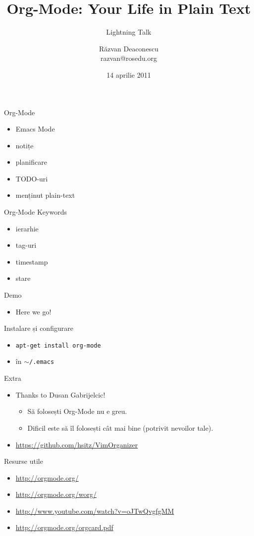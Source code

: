 \documentclass{simple}
\title[Org-Mode]{Org-Mode: Your Life in Plain Text}
\subtitle{Lightning Talk}
\institute{Întâlnirile RLUG -- Aprilie 2011}
\author[Răzvan Deaconescu]{Răzvan Deaconescu\\
	razvan@rosedu.org}
\date{14 aprilie 2011}
\begin{document}
\frame{\titlepage}

\begin{frame}{Org-Mode}
  \begin{itemize}
    \item Emacs Mode
    \item notițe
    \item planificare
    \item TODO-uri
    \item menținut plain-text
  \end{itemize}
\end{frame}

\begin{frame}{Org-Mode Keywords}
  \begin{itemize}
    \item ierarhie
    \item tag-uri
    \item timestamp
    \item stare
  \end{itemize}
\end{frame}

\begin{frame}{Demo}
  \begin{itemize}
    \item Here we go!
  \end{itemize}
\end{frame}

\begin{frame}{Instalare și configurare}
  \begin{itemize}
    \item \texttt{apt-get install org-mode}
    \item în \texttt{$\sim$/.emacs}
  \end{itemize}
  \begin{beamerboxesrounded}[lower=block body,shadow=true]{}
    \scriptsize 
  \end{beamerboxesrounded}
\end{frame}

\begin{frame}{Extra}
  \begin{itemize}
    \item Thanks to Dusan Gabrijelcic!
      \begin{itemize}
        \item Să folosești Org-Mode nu e greu.
        \item Dificil este să îl folosești cât mai bine (potrivit nevoilor
        tale).
      \end{itemize}
    \item \url{https://github.com/hsitz/VimOrganizer}
  \end{itemize}
\end{frame}

\begin{frame}{Resurse utile}
	\begin{itemize}
        \item \url{http://orgmode.org/}
        \item \url{http://orgmode.org/worg/}
		\item \url{http://www.youtube.com/watch?v=oJTwQvgfgMM}
        \item \url{http://orgmode.org/orgcard.pdf}
    \end{itemize}
\end{frame}
\end{document}
